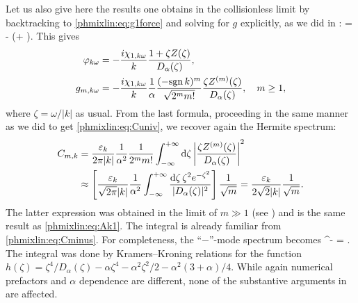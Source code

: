Let us also give here the results one obtains in the collisionless 
limit by backtracking to \eqref{phmixlin:eq:g1force} and solving for $g$ explicitly, 
as we did in :
\beq
\gko = - \lt(\phiko + \rt).
\label{phmixlin:eq:gko1}
\eeq
This gives
\begin{align}
\label{phmixlin:eq:phiko1}
\varphi_{k\omega} &= - \frac{i\chi_{1,k\omega}}{k}\frac{1 + \zeta Z(\zeta)}{D_\alpha(\zeta)},\\
g_{m,k\omega} &= - \frac{i\chi_{1,k\omega}}{k}\frac{1}{\alpha}\frac{(-{\rm sgn}\, k)^m}{\sqrt{2^m m!}}
\frac{\zeta Z^{(m)}(\zeta)}{D_\alpha(\zeta)},\quad m\ge1,
\label{phmixlin:eq:gm1}
\end{align}
where $\zeta = \omega/|k|$ as usual. From the last formula, 
proceeding in the same manner as we did to get \eqref{phmixlin:eq:Cuniv}, we recover again
the Hermite spectrum: 
\begin{align}
C_{m,k} &= \frac{\varepsilon_k}{2\pi|k|}\frac{1}{\alpha^2} 
\frac{1}{2^m m!}\int_{-\infty}^{+\infty}{\rm d}\zeta\left|\frac{\zeta Z^{(m)}(\zeta)}{D_\alpha(\zeta)}\right|^2\\
&\approx \left[\frac{\varepsilon_k}{\sqrt{2\pi}|k|}\frac{1}{\alpha^2}
\int_{-\infty}^{+\infty}\frac{{\rm d}\zeta\,\zeta^2 e^{-\zeta^2}}{|D_\alpha(\zeta)|^2}\right]\frac{1}{\sqrt{m}}
=\frac{\varepsilon_k}{2\sqrt{2 } |k|} \frac{1}{\sqrt{m}}. 
\label{phmixlin:eq:Cuniv1}
\end{align}
The latter expression was obtained in the limit of $m\gg1$ (see ) 
and is the same result as \eqref{phmixlin:eq:Ak1}. The integral is already familiar from \eqref{phmixlin:eq:Cminus}. 
For completeness, the ``$-$''-mode spectrum  becomes 
\beq
\Cmk^- \approx {} 
 =  . 
\label{phmixlin:eq:Cminus1}
\eeq
The integral was done by Kramers--Kroning relations
for the function $h(\zeta) = \zeta^4/D_\alpha(\zeta) - \alpha\zeta^4 - \alpha^2\zeta^2/2 
- \alpha^2(3+\alpha)/4$. While again numerical prefactors and $\alpha$ dependence 
are different, none of the substantive arguments in  are affected. 

